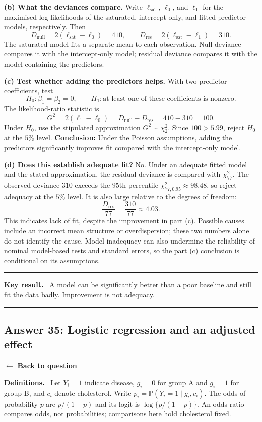 \documentclass[11pt,a4paper]{article}
\newcommand{\given}{\mathrel{|}}
\newcommand{\answernav}[1]{%
  \label{answer:#1}%
  \noindent\hyperref[question:#1]{$\leftarrow$ \textbf{Back to question}}%
  \par\smallskip}
\newcommand{\studyheading}[1]{%
  \par\medskip\noindent\textcolor{statblue}{\textbf{#1.}}\ }
\newenvironment{keyresult}
  {\begin{center}\begin{minipage}{0.92\linewidth}\color{statblue}%
   \hrule\vspace{6pt}\textbf{Key result.}\ }
  {\vspace{6pt}\hrule\end{minipage}\end{center}}
\begin{document}
\textbf{(b) What the deviances compare.}
Write $\ell_{\mathrm{sat}}$, $\ell_0$, and $\ell_1$ for the maximised
log-likelihoods of the saturated, intercept-only, and fitted predictor
models, respectively. Then
\[
D_{\mathrm{null}}=2(\ell_{\mathrm{sat}}-\ell_0)=410,
\qquad
D_{\mathrm{res}}=2(\ell_{\mathrm{sat}}-\ell_1)=310.
\]
The saturated model fits a separate mean to each observation. Null deviance
compares it with the intercept-only model; residual deviance compares it
with the model containing the predictors.

\textbf{(c) Test whether adding the predictors helps.}
With two predictor coefficients, test
\[
H_0:\beta_1=\beta_2=0,
\qquad H_1:\text{at least one of these coefficients is nonzero}.
\]
The likelihood-ratio statistic is
\[
G^2=2(\ell_1-\ell_0)
=D_{\mathrm{null}}-D_{\mathrm{res}}
=410-310=100.
\]
Under $H_0$, use the stipulated approximation $G^2\sim\chi^2_2$.
Since $100>5.99$, reject $H_0$ at the $5\%$ level.
\textbf{Conclusion:} Under the Poisson assumptions, adding the predictors
significantly improves fit compared with the intercept-only model.

\textbf{(d) Does this establish adequate fit?}
No. Under an adequate fitted model and the stated approximation,
the residual deviance is compared with $\chi^2_{77}$. The observed
deviance $310$ exceeds the $95$th percentile $\chi^2_{77,0.95}\approx98.48$,
so reject adequacy at the $5\%$ level. It is also large relative to the
degrees of freedom:
\[
\frac{D_{\mathrm{res}}}{77}=\frac{310}{77}\approx4.03.
\]
This indicates lack of fit, despite the improvement in part (c).
Possible causes include an incorrect mean structure or overdispersion;
these two numbers alone do not identify the cause. Model inadequacy can
also undermine the reliability of nominal model-based tests and standard
errors, so the part (c) conclusion is conditional on its assumptions.

\begin{keyresult}
A model can be significantly better than a poor baseline and still fit
the data badly. Improvement is not adequacy.
\end{keyresult}

\clearpage

\subsection{Answer 35: Logistic regression and an adjusted effect}
\answernav{35}

\studyheading{Definitions}
Let $Y_i=1$ indicate disease, $g_i=0$ for group A and $g_i=1$ for group B, and $c_i$ denote cholesterol.
Write $p_i=\mathbb P(Y_i=1\given g_i,c_i)$.
The odds of probability $p$ are $p/(1-p)$ and its logit is $\log\{p/(1-p)\}$.
An odds ratio compares odds, not probabilities; comparisons here hold cholesterol fixed.
\end{document}
